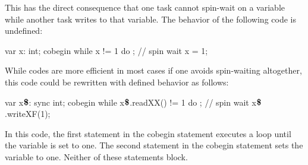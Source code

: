 \begin{example}
This has the direct consequence that one task cannot spin-wait on a
variable while another task writes to that variable.  The behavior of
the following code is undefined:
\begin{chapel}
var x: int;
cobegin {
  while x != 1 do ;  // spin wait
  x = 1;
}
\end{chapel}
While codes are more efficient in most cases if one avoids
spin-waiting altogether, this code could be rewritten with defined
behavior as follows:
\begin{chapelpre}
\end{chapelpre}
\begin{chapel}
var x$\mbox{{\bf \$}}$: sync int;
cobegin {
  while x$\mbox{{\bf \$}}$.readXX() != 1 do ;  // spin wait
  x$\mbox{{\bf \$}}$.writeXF(1);
}
\end{chapel}
\begin{chapeloutput}
\end{chapeloutput}
In this code, the first statement in the cobegin statement executes a
loop until the variable is set to one.  The second statement in the
cobegin statement sets the variable to one.  Neither of these
statements block.
\end{example}
